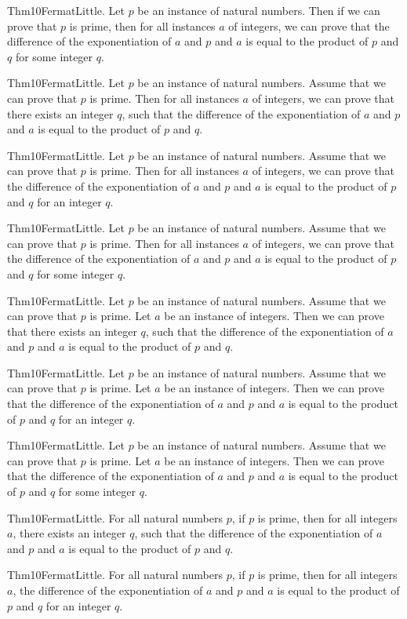 \documentclass{article}
\begin{document}
Thm10FermatLittle. Let $p$ be an instance of natural numbers. Then if we can prove that $p$ is prime, then for all instances $a$ of integers, we can prove that the difference of the exponentiation of $a$ and $p$ and $a$ is equal to the product of $p$ and $q$ for some integer $q$.

Thm10FermatLittle. Let $p$ be an instance of natural numbers. Assume that we can prove that $p$ is prime. Then for all instances $a$ of integers, we can prove that there exists an integer $q$, such that the difference of the exponentiation of $a$ and $p$ and $a$ is equal to the product of $p$ and $q$.

Thm10FermatLittle. Let $p$ be an instance of natural numbers. Assume that we can prove that $p$ is prime. Then for all instances $a$ of integers, we can prove that the difference of the exponentiation of $a$ and $p$ and $a$ is equal to the product of $p$ and $q$ for an integer $q$.

Thm10FermatLittle. Let $p$ be an instance of natural numbers. Assume that we can prove that $p$ is prime. Then for all instances $a$ of integers, we can prove that the difference of the exponentiation of $a$ and $p$ and $a$ is equal to the product of $p$ and $q$ for some integer $q$.

Thm10FermatLittle. Let $p$ be an instance of natural numbers. Assume that we can prove that $p$ is prime. Let $a$ be an instance of integers. Then we can prove that there exists an integer $q$, such that the difference of the exponentiation of $a$ and $p$ and $a$ is equal to the product of $p$ and $q$.

Thm10FermatLittle. Let $p$ be an instance of natural numbers. Assume that we can prove that $p$ is prime. Let $a$ be an instance of integers. Then we can prove that the difference of the exponentiation of $a$ and $p$ and $a$ is equal to the product of $p$ and $q$ for an integer $q$.

Thm10FermatLittle. Let $p$ be an instance of natural numbers. Assume that we can prove that $p$ is prime. Let $a$ be an instance of integers. Then we can prove that the difference of the exponentiation of $a$ and $p$ and $a$ is equal to the product of $p$ and $q$ for some integer $q$.

Thm10FermatLittle. For all natural numbers $p$, if $p$ is prime, then for all integers $a$, there exists an integer $q$, such that the difference of the exponentiation of $a$ and $p$ and $a$ is equal to the product of $p$ and $q$.

Thm10FermatLittle. For all natural numbers $p$, if $p$ is prime, then for all integers $a$, the difference of the exponentiation of $a$ and $p$ and $a$ is equal to the product of $p$ and $q$ for an integer $q$.
\end{document}
